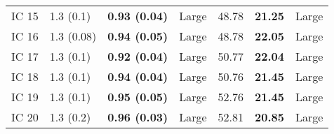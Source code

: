 \begin{tabular}{lllllll}
 IC 15 &         1.3 (0.1) &  \textbf{0.93 (0.04)} &       Large &                   48.78 &           \textbf{21.25} &       Large \\
 IC 16 &        1.3 (0.08) &  \textbf{0.94 (0.05)} &       Large &                   48.78 &           \textbf{22.05} &       Large \\
 IC 17 &         1.3 (0.1) &  \textbf{0.92 (0.04)} &       Large &                   50.77 &           \textbf{22.04} &       Large \\
 IC 18 &         1.3 (0.1) &  \textbf{0.94 (0.04)} &       Large &                   50.76 &           \textbf{21.45} &       Large \\
 IC 19 &         1.3 (0.1) &  \textbf{0.95 (0.05)} &       Large &                   52.76 &           \textbf{21.45} &       Large \\
 IC 20 &         1.3 (0.2) &  \textbf{0.96 (0.03)} &       Large &                   52.81 &           \textbf{20.85} &       Large \\
\bottomrule
\end{tabular}
